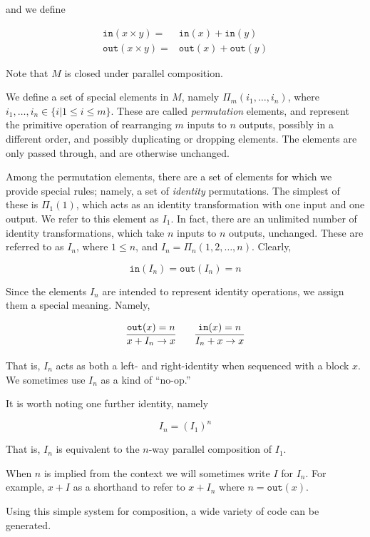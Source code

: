 and we define

\begin{eqnarray*}
\mathtt{in} (x \times y) =& \mathtt{in}(x)  + \mathtt{in}(y)\\ 
\mathtt{out}(x
\times y) =& \mathtt{out}(x) + \mathtt{out}(y) \end{eqnarray*}

Note that $M$ is closed under parallel composition.

We define a set of special elements in $M$, namely $\Pi_m(i_1,\ldots,i_n)$, where $i_1,\ldots,i_n \in \lbrace i | 1 \leq i \leq m \rbrace$. These are called \emph{permutation} elements, and represent the primitive operation of rearranging $m$ inputs to $n$ outputs, possibly in a different order, and possibly duplicating or dropping elements. The elements are only passed through, and are otherwise unchanged.

Among the permutation elements, there are a set of elements for which we provide special rules; namely, a set of \emph{identity} permutations. The simplest of these is $\Pi_1(1)$, which acts as an identity transformation with one input and one output. We refer to this element as $I_1$. In fact, there are an unlimited number of identity transformations, which take $n$ inputs to $n$ outputs, unchanged. These are referred to as $I_n$, where $1 \leq n$, and $I_n = \Pi_n(1,2,\ldots,n)$. Clearly,

\[
\mathtt{in}(I_n) = \mathtt{out}(I_n) = n
\]

Since the elements $I_n$ are intended to represent identity operations, we assign them a special meaning. Namely,

\[
\infer{x + I_n \to x}{\mathtt{out}(x) = n} 
\qquad
\infer{I_n + x \to x}{\mathtt{in}(x) = n}
\]

That is, $I_n$ acts as both a left- and right-identity when sequenced with a block $x$. We sometimes use $I_n$ as a kind of ``no-op.''

It is worth noting one further identity, namely

\[
I_n = (I_1)^n
\]

That is, $I_n$ is equivalent to the $n$-way parallel composition of $I_1$.

When $n$ is implied from the context we will sometimes write $I$ for $I_n$. For example, $x+I$ as a shorthand to refer to $x+I_n$ where $n = \mathtt{out}(x)$.

Using this simple system for composition, a wide variety of code can be generated.
